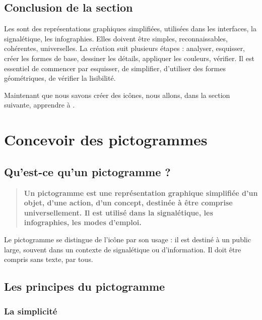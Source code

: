 \subsection*{Conclusion de la section}

Les  sont des représentations graphiques simplifiées, utilisées dans les interfaces, la signalétique, les infographies. Elles doivent être simples, reconnaissables, cohérentes, universelles. La création suit plusieurs étapes : analyser, esquisser, créer les formes de base, dessiner les détails, appliquer les couleurs, vérifier. Il est essentiel de commencer par esquisser, de simplifier, d'utiliser des formes géométriques, de vérifier la lisibilité.

Maintenant que nous savons créer des icônes, nous allons, dans la section suivante, apprendre à .

\section{Concevoir des pictogrammes}

\subsection{Qu'est-ce qu'un pictogramme ?}

\begin{quote}
\textbf{Un pictogramme est une représentation graphique simplifiée d'un objet, d'une action, d'un concept, destinée à être comprise universellement. Il est utilisé dans la signalétique, les infographies, les modes d'emploi.}
\end{quote}

Le pictogramme se distingue de l'icône par son usage : il est destiné à un public large, souvent dans un contexte de signalétique ou d'information. Il doit être compris sans texte, par tous.

\subsection{Les principes du pictogramme}

\subsubsection{La simplicité}

